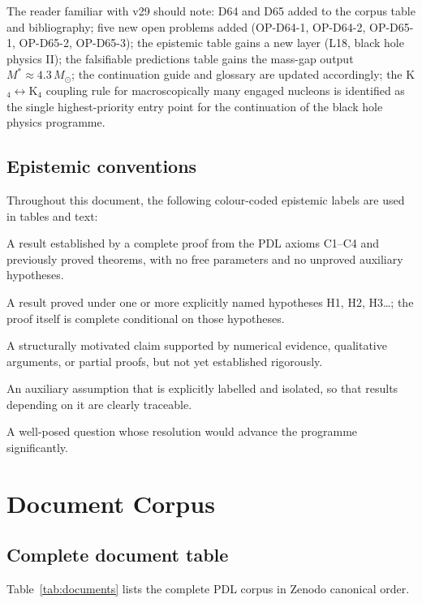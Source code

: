 \documentclass[11pt,a4paper]{article}
\theoremstyle{plain}
\theoremstyle{definition}
\theoremstyle{remark}
\begin{document}
The reader familiar with v29 should note: D64 and D65 added to the corpus table and bibliography; five new open problems added (OP-D64-1, OP-D64-2, OP-D65-1, OP-D65-2, OP-D65-3); the epistemic table gains a new layer (L18, black hole physics II); the falsifiable predictions table gains the mass-gap output $M^*\approx4.3\,M_\odot$; the continuation guide and glossary are updated accordingly; the K$_4\leftrightarrow$K$_4$ coupling rule for macroscopically many engaged nucleons is identified as the single highest-priority entry point for the continuation of the black hole physics programme.

\subsection{Epistemic conventions}
\label{subsec:conventions}
Throughout this document, the following colour-coded epistemic labels are used in tables and text:
\begin{description}[leftmargin=2.5cm, style=nextline]
\item[\textcolor{proofblue}{Theorem}] A result established by a complete proof from the PDL axioms C1--C4 and previously proved theorems, with no free parameters and no unproved auxiliary hypotheses.
\item[\textcolor{proofblue}{Theorem (H$x$)}] A result proved under one or more explicitly named hypotheses H1, H2, H3\ldots; the proof itself is complete conditional on those hypotheses.
\item[\textcolor{conjecturegreen}{Conjecture}] A structurally motivated claim supported by numerical evidence, qualitative arguments, or partial proofs, but not yet established rigorously.
\item[\textcolor{hypothesisorange}{Named Hypothesis}] An auxiliary assumption that is explicitly labelled and isolated, so that results depending on it are clearly traceable.
\item[\textcolor{openproblemred}{Open Problem}] A well-posed question whose resolution would advance the programme significantly.
\end{description}

\section{Document Corpus}
\label{sec:corpus}

\subsection{Complete document table}
\label{subsec:doctable}
Table~\ref{tab:documents} lists the complete PDL corpus in Zenodo canonical order.
\end{document}
